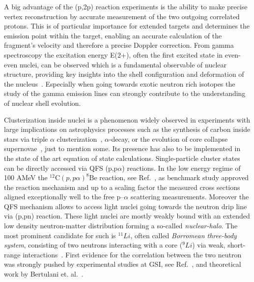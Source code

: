 \begin{description}
A big advantage of the (p,2p) reaction experiments is the ability to make precise vertex reconstruction by accurate measurement of the two outgoing correlated protons. This is of particular importance for extended targets and determines the emission point within the target, enabling an accurate calculation of the fragment's velocity and therefore a precise Doppler correction.\newline
From gamma spectroscopy the excitation energy E(2+), often the first excited state in even-even nuclei, can be observed which is a fundamental observable of nuclear structure, providing key insights into the shell configuration and deformation of the nucleus~\cite{panin2021quasi}. Especially when going towards exotic neutron rich isotopes the study of the gamma emission lines can strongly contribute to the understanding of nuclear shell evolution.
\item[QFS to probe inner clustering and halo formation]Clusterization inside nuclei is a phenomenon widely observed in experiments with large implications on astrophysics processes such as the synthesis of carbon  inside stars via triple $\alpha$ clusterization~\cite{hjorth2011carbon}, $\alpha$-decay, or the evolution of core collapse supernovae~\cite{sumiyoshi2008appearance}, just to mention some. Its presence has also to be implemented in the state of the art equation of state calculations.\newline
Single-particle cluster states can be directly accessed via QFS (p,p$\alpha$) reactions. In the low energy regime of 100 AMeV the $^{12}\text{C}(p, p\alpha)^{8}\text{Be}$ reaction, see Ref.~\cite{mabiala2009analyzing}, as benchmark study approved the reaction mechanism and up to a scaling factor the measured cross sections aligned exceptionally well to the free p–$\alpha$ scattering measurements.\newline
Moreover the QFS mechanism allows to access light nuclei going towards the neutron drip line via (p,pn) reaction. These light nuclei are mostly weakly bound with an extended low density neutron-matter distribution forming a so-called \textit{nuclear-halo}.\newline
The most prominent candidate for such is $^{11}Li$, often called \textit{Borromean three-body system}, consisting of two neutrons interacting with a core ($^9Li$) via weak, short-range interactions~\cite{johannsen199011li}. First evidence for the correlation  between the two neutron was strongly pushed by experimental studies at GSI, see Ref.~\cite{simon1999direct}, and theoretical work by Bertulani et. al.~\cite{bertulani2007geometry}.\newline

\end{description}
